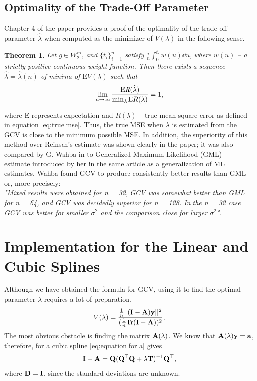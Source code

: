 \documentclass[11pt,leqno]{book}
\theoremstyle{definition}
\theoremstyle{plain}
\newtheorem{theorem}{Theorem}[section]
\theoremstyle{definition}
\begin{document}
{\subsection{Optimality of the Trade-Off Parameter}
Chapter 4 of the paper \cite{Craven1978} provides a proof of the optimality of the trade-off parameter $\hat{\lambda}$ when computed as the minimizer of $V(\lambda)$ in the following sense.
\begin{theorem}\textit{
Let $g \in W^{m}_2$, and $\{t_i\}_{i=1}^n$ satisfy $\frac{i}{n}\int_0^{t_i}w(u)\dd u$, where $w(u)$ -- a strictly positive continuous weight function. Then there exists a sequence $\hat{\lambda}=\hat{\lambda}(n)$ of minima of $\textrm{E}V(\lambda)$ such that
\begin{equation*}
    \lim_{n \to \infty}\frac{\textnormal{E}R({\hat{\lambda})}}{\min_\lambda \textnormal{E}R(\lambda)}= 1,
\end{equation*}}
\end{theorem}
\noindent where E represents expectation and $R(\lambda)$ -- true mean square error as defined in equation \eqref{eq:true mse}. Thus, the true MSE when $\lambda$ is estimated from the GCV is close to the minimum possible MSE. In addition, the superiority of this method over Reinsch's estimate was shown clearly in the paper; it was also compared by G. Wahba in \cite{WahbaGCVvsGML} to Generalized Maximum Likelihood (GML) -- estimate introduced by her in the same article as a generalization of ML estimates. Wahba found GCV to produce consistently better results than GML or, more precisely:\\
\textit{"Mixed results were obtained for n = 32, GCV was somewhat better than GML for n = 64, and GCV was decidedly superior for n = 128. In the n = 32 case GCV was better for smaller $\sigma^2$ and the comparison close for larger $\sigma^2$".}
\section{Implementation for the Linear and Cubic Splines}
Although we have obtained the formula for GCV, using it to find the optimal parameter $\lambda$ requires a lot of preparation. 
\begin{equation*}
V(\lambda) =\frac{\frac{1}{n}||(\vb{I}-\vb{A})\vb{y}||^2}{(\frac{1}{n}\text{Tr}(\vb{I}-\vb{A}))^2},
\end{equation*}
The most obvious obstacle is finding the matrix $\vb{A}(\lambda)$. We know that $\vb{A}(\lambda)\vb{y}=\vb{a}$, therefore, for a cubic spline \eqref{eq:equation for a} gives \begin{equation}
\vb{I}-\vb{A}=\vb{Q}(\vb{Q^\top Q}+\lambda \vb{T})^{-1}\vb{Q}^\top ,
\label{eq:I-A}
\end{equation}
where $\vb{D}=\vb{I}$, since the standard deviations are unknown.

}
\end{document}
